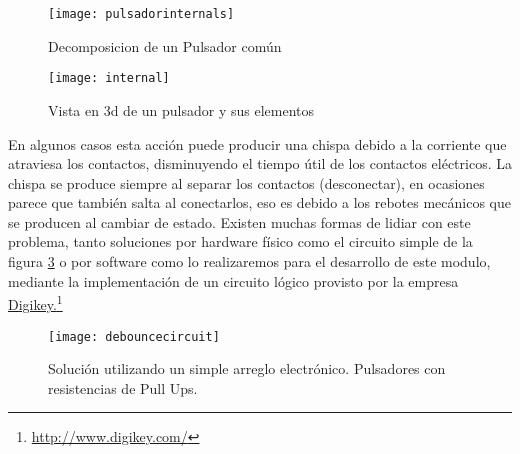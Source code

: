 \documentclass[a4paper]{article}
\newcommand\fnurl[2]{%
\href{#2}{#1}\footnote{\url{#2}}%
}
\begin{document}
\begin{figure}[H]
  \centering
     \texttt{[image: pulsadorinternals]}
  \caption{Decomposicion de un Pulsador común}
      \label{fig:pulsadorinternal1}
\end{figure}
\begin{figure}[H]
  \centering
     \texttt{[image: internal]}
  \caption{Vista en 3d de un pulsador y sus elementos }
      \label{fig:pulsadorinternal2}
\end{figure}
\label{sec:pulsador} 
En algunos casos esta acción puede producir una chispa debido a la corriente que atraviesa los contactos, disminuyendo el tiempo útil de los contactos eléctricos. La chispa se produce siempre al separar los contactos (desconectar), en ocasiones parece que también salta al conectarlos, eso es debido a los rebotes mecánicos que se producen al cambiar de estado.
Existen muchas formas de lidiar con este problema, tanto soluciones por hardware físico como el circuito simple de la figura \ref{fig:hardwc} o por software como lo realizaremos para el desarrollo de este modulo, mediante la implementación de un circuito lógico provisto por la empresa \fnurl{Digikey.}{http://www.digikey.com/}\\
\begin{figure}[H]
  \centering
     \texttt{[image: debouncecircuit]}
  \caption{Solución utilizando un simple arreglo electrónico. Pulsadores con resistencias de Pull Ups.}
      \label{fig:hardwc}
\end{figure}
\end{document}
